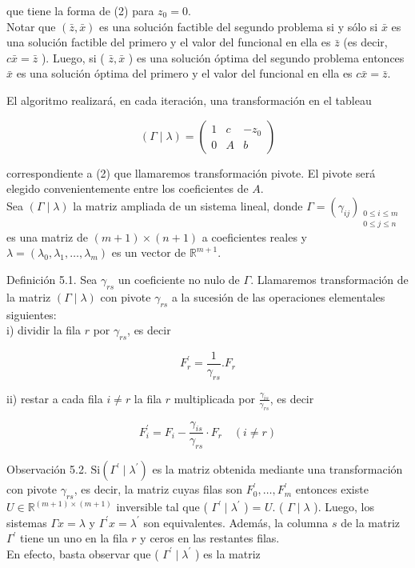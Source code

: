 \documentclass[10pt]{article}
\begin{document}
que tiene la forma de (2) para $z_{0}=0$.\\
Notar que $(\bar{z}, \bar{x})$ es una solución factible del segundo problema si y sólo si $\bar{x}$ es una solución factible del primero y el valor del funcional en ella es $\bar{z}$ (es decir, $c \bar{x}=\bar{z}$ ). Luego, si ( $\bar{z}, \bar{x}$ ) es una solución óptima del segundo problema entonces $\bar{x}$ es una solución óptima del primero y el valor del funcional en ella es $c \bar{x}=\bar{z}$.

El algoritmo realizará, en cada iteración, una transformación en el tableau

$$
(\Gamma \mid \lambda)=\left(\begin{array}{cc|c}
1 & c & -z_{0} \\
0 & A & b
\end{array}\right)
$$

correspondiente a (2) que llamaremos transformación pivote. El pivote será elegido convenientemente entre los coeficientes de $A$.\\
Sea $(\Gamma \mid \lambda)$ la matriz ampliada de un sistema lineal, donde $\Gamma=\left(\gamma_{i j}\right)_{\substack{0 \leq i \leq m \\ 0 \leq j \leq n}}$ es una matriz de $(m+1) \times(n+1)$ a coeficientes reales y $\lambda=\left(\lambda_{0}, \lambda_{1}, \ldots, \lambda_{m}\right)$ es un vector de $\mathbb{R}^{m+1}$.

Definición 5.1. Sea $\gamma_{r s}$ un coeficiente no nulo de $\Gamma$. Llamaremos transformación de la matriz $(\Gamma \mid \lambda)$ con pivote $\gamma_{r s}$ a la sucesión de las operaciones elementales siguientes:\\
i) dividir la fila $r$ por $\gamma_{r s}$, es decir

$$
F_{r}^{\prime}=\frac{1}{\gamma_{r s}} . F_{r}
$$

ii) restar a cada fila $i \neq r$ la fila $r$ multiplicada por $\frac{\gamma_{i s}}{\gamma_{r s}}$, es decir

$$
F_{i}^{\prime}=F_{i}-\frac{\gamma_{i s}}{\gamma_{r s}} \cdot F_{r} \quad(i \neq r)
$$

Observación 5.2. $\mathrm{Si}\left(\Gamma^{\prime} \mid \lambda^{\prime}\right)$ es la matriz obtenida mediante una transformación con pivote $\gamma_{r s}$, es decir, la matriz cuyas filas son $F_{0}^{\prime}, \ldots, F_{m}^{\prime}$ entonces existe $U \in \mathbb{R}^{(m+1) \times(m+1)}$ inversible tal que ( $\Gamma^{\prime} \mid \lambda^{\prime}$ ) = $U$. ( $\Gamma \mid \lambda$ ). Luego, los sistemas $\Gamma x=\lambda$ y $\Gamma^{\prime} x=\lambda^{\prime}$ son equivalentes. Además, la columna $s$ de la matriz $\Gamma^{\prime}$ tiene un uno en la fila $r$ y ceros en las restantes filas.\\
En efecto, basta observar que ( $\Gamma^{\prime} \mid \lambda^{\prime}$ ) es la matriz
\end{document}
